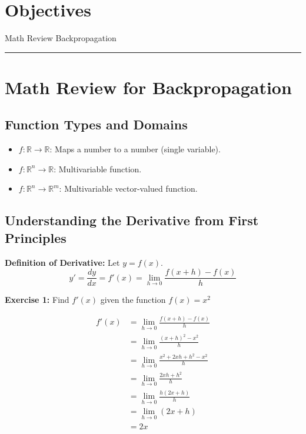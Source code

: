 \section*{Objectives}

\begin{outline}
    \1 Math Review
    \1 Backpropagation
    
\end{outline}

\rule[0.0051in]{\textwidth}{0.00025in}

\section{Math Review for Backpropagation}

\subsection{Function Types and Domains}

\begin{itemize}
    \item $f: \mathbb{R} \to \mathbb{R}$: Maps a number to a number (single variable).
    \item $f: \mathbb{R}^n \to \mathbb{R}$: Multivariable function.
    \item $f: \mathbb{R}^n \to \mathbb{R}^m$: Multivariable vector-valued function.
\end{itemize}

\subsection{Understanding the Derivative from First Principles}

\textbf{Definition of Derivative:} Let $y = f(x)$.
\[
y' = \frac{dy}{dx} = f'(x) = \lim_{h \to 0} \frac{f(x+h) - f(x)}{h}
\]

\textbf{Exercise 1:} Find \( f'(x) \) given the function \( f(x) = x^2 \)

\begin{align*}
f'(x) &= \lim_{h \to 0} \frac{f(x+h) - f(x)}{h} \\
      &= \lim_{h \to 0} \frac{(x+h)^2 - x^2}{h} \\
      &= \lim_{h \to 0} \frac{x^2 + 2xh + h^2 - x^2}{h} \\
      &= \lim_{h \to 0} \frac{2xh + h^2}{h} \\
      &= \lim_{h \to 0} \frac{h(2x + h)}{h} \\
      &= \lim_{h \to 0} (2x + h) \\
      &= 2x
\end{align*}

